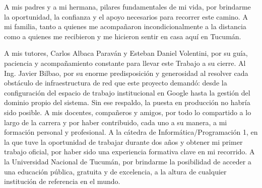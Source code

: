 \documentclass[
	11pt, %
	openany, %
	spanish,
	singlespacing, %
	parskip, %
	headsepline, %
	fleqn, %
	leqno, %
]{MastersDoctoralThesis} %
\renewcommand{\listtablename}{Índice de Tablas}
\begin{document}
\begin{acknowledgements}
\vspace{15mm}

A mis padres y a mi hermana, pilares fundamentales de mi vida, por brindarme la oportunidad, la confianza y el apoyo necesarios para recorrer este camino. A mi familia, tanto a quienes me acompañaron incondicionalmente a la distancia como a quienes me recibieron y me hicieron sentir en casa aquí en Tucumán.

A mis tutores, Carlos Albaca Paraván y Esteban Daniel Volentini, por su guía, paciencia y acompañamiento constante para llevar este Trabajo a su cierre. Al Ing. Javier Bilbao, por su enorme predisposición y generosidad al resolver cada obstáculo de infraestructura de red que este proyecto demandó: desde la configuración del espacio de trabajo institucional en Google hasta la gestión del dominio propio del sistema. Sin ese respaldo, la puesta en producción no habría sido posible. A mis docentes, compañeros y amigos, por todo lo compartido a lo largo de la carrera y por haber contribuido, cada uno a su manera, a mi formación personal y profesional. A la cátedra de Informática/Programación 1, en la que tuve la oportunidad de trabajar durante dos años y obtener mi primer trabajo oficial, por haber sido una experiencia formativa clave en mi recorrido. A la Universidad Nacional de Tucumán, por brindarme la posibilidad de acceder a una educación pública, gratuita y de excelencia, a la altura de cualquier institución de referencia en el mundo.

\end{acknowledgements}

\renewcommand{\listtablename}{Índice de Tablas}

\tableofcontents 

\listoffigures 

\listoftables 

\end{document}
